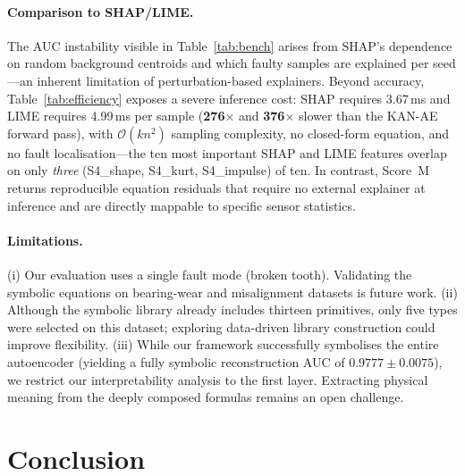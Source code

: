 \documentclass[conference]{IEEEtran}
\begin{document}
\paragraph*{Comparison to SHAP/LIME.}
The AUC instability visible in Table~\ref{tab:bench} arises from
SHAP's dependence on random background centroids and which faulty
samples are explained per seed---an inherent limitation of
perturbation-based explainers. Beyond accuracy,
Table~\ref{tab:efficiency} exposes a severe inference cost: SHAP
requires 3.67\,ms and LIME requires 4.99\,ms per sample
(\textbf{276$\times$} and \textbf{376$\times$} slower than the KAN-AE
forward pass), with $\mathcal{O}(kn^2)$ sampling complexity, no
closed-form equation, and no fault localisation---the ten most
important SHAP and LIME features overlap on only \emph{three} (S4\_shape, S4\_kurt, S4\_impulse) of ten.
In contrast, Score~M returns reproducible equation residuals that
require no external explainer at inference and are directly mappable
to specific sensor statistics.

\paragraph*{Limitations.}
(i) Our evaluation uses a single fault mode (broken tooth).
Validating the symbolic equations on bearing-wear and
misalignment datasets is future work.
(ii) Although the symbolic library already includes thirteen
primitives, only
five types were selected on this dataset; exploring
data-driven library construction could improve flexibility.
(iii) While our framework successfully symbolises the entire
autoencoder (yielding a fully symbolic reconstruction AUC
of $0.9777\pm0.0075$),
we restrict our interpretability analysis to the first layer.
Extracting physical meaning from the deeply composed
formulas remains an open challenge.

\section{Conclusion}
\label{sec:conclusion}
\end{document}
